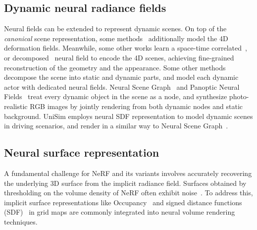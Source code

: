\subsection{Dynamic neural radiance fields} 
Neural fields \cite{xie2022neural} can be extended to represent dynamic scenes. On top of the \textit{canonical} scene representation, some methods~\cite{pumarola2020d, park2021nerfies, park2021hypernerf,yuan2021star} additionally model the 4D deformation fields. Meanwhile, some other works learn a space-time correlated~\cite{kplanes_2023, li2020neural, attal2023hyperreel, liu2023robust}, or decomposed~\cite{turki2023suds,wu2022d,yang2023emernerf} neural field to encode the 4D scenes, achieving fine-grained reconstruction of the geometry and the appearance.
%
Some other methods decompose the scene into static and dynamic parts, and model each dynamic actor with dedicated neural fields. 
Neural Scene Graph~\cite{Ost_2021_CVPR} and Panoptic Neural Fields~\cite{KunduCVPR2022PNF} treat every dynamic object in the scene as a node, and synthesize photo-realistic RGB images by jointly rendering from both dynamic nodes and static background. UniSim\cite{yang2023unisim} employs neural SDF representation to model dynamic scenes in driving scenarios, and render in a similar way to Neural Scene Graph~\cite{Ost_2021_CVPR}.

\subsection{Neural surface representation}
A fundamental challenge for NeRF and its variants involves accurately recovering the underlying 3D surface from the implicit radiance field. Surfaces obtained by thresholding on the volume density of NeRF often exhibit noise~\cite{wang2021neus, yariv2021volume}. To address this, implicit surface representations like Occupancy~\cite{niemeyer2020differentiable, oechsle2021unisurf} and signed distance functions (SDF)~\cite{wang2021neus, yariv2021volume, yu2022monosdf, sun2022neural, wang2022hf, zuo2023incremental, li2023neuralangelo, wang2023neus2} in grid maps are commonly integrated into neural volume rendering techniques.


